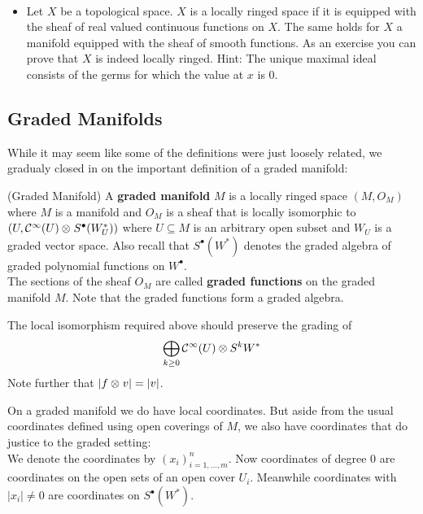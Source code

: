 \begin{example}~
  \begin{itemize}
    \item Let $X$ be a topological space. $X$ is a locally ringed space if it is equipped with the sheaf of real valued continuous functions on $X$. The same holds for $X$ a manifold equipped with the sheaf of smooth functions. As an exercise you can prove that $X$ is indeed locally ringed. Hint: The unique maximal ideal consists of the germs for which the value at $x$ is $0$.
  \end{itemize}
\end{example}

\newpage
\subsection{Graded Manifolds}

While it may seem like some of the definitions were just loosely related, we gradualy closed in on the important definition of a graded manifold:

\begin{definition} (Graded Manifold)
  A \textbf{graded manifold} $M$ is a locally ringed space $(M, O_M)$ where $M$ is a manifold and $O_M$ is a sheaf that is locally isomorphic to $(U, \mathcal{C}^{\infty}(U) \mathbin{\mathop{\otimes}\displaylimits_{}} S^\bullet(W_U^*))$ where $U\subseteq M$ is an arbitrary open subset and $W_U$ is a graded vector space. Also recall that $S^\bullet(W^*)$ denotes the graded algebra of graded polynomial functions on $W^\bullet$.\\

  The sections of the sheaf $O_M$ are called \textbf{graded functions} on the graded manifold $M$. Note that the graded functions form a graded algebra.
\end{definition}

\begin{rem}
  The local isomorphism required above should preserve the grading of
  $$ \bigoplus_{k \geq 0} \mathcal{C}^{\infty}(U) \mathbin{\mathop{\otimes}\displaylimits_{}} S^k W^*$$
  Note further that $|f  \mathbin{\mathop{\otimes}\displaylimits_{}} v| = |v|$.
\end{rem}

On a graded manifold we do have local coordinates. But aside from the usual coordinates defined using open coverings of $M$, we also have coordinates that do justice to the graded setting:\\

We denote the coordinates by $(x_i)^n_{i= 1,...,m}$. Now coordinates of degree $0$ are coordinates on the open sets of an open cover $U_i$. Meanwhile coordinates with $|x_i| \neq 0$ are coordinates on $S^\bullet(W^*)$.\\

